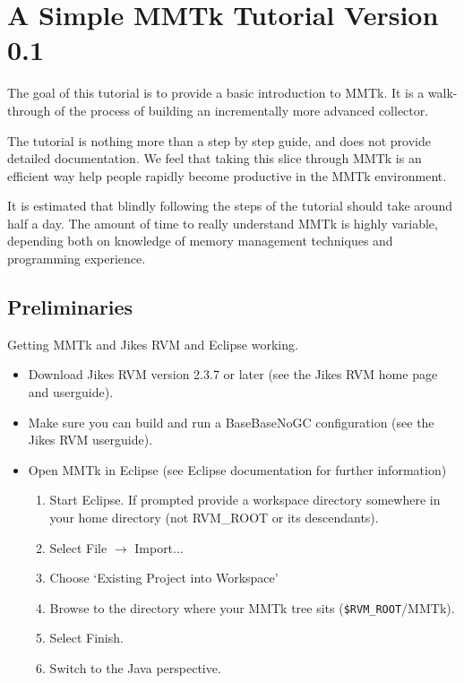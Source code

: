 \documentclass[textsize=14pt]{article}
\newcommand{\env}[1]{\texttt{\$#1}}
\newcommand{\file}[1]{\textsf{#1}}
\newcommand{\menu}[0]{$\rightarrow$}
\begin{document}
\section{A Simple MMTk Tutorial Version 0.1}

The goal of this tutorial is to provide a basic introduction to
MMTk. It is a walk-through of the process of building an
incrementally more advanced collector.

The tutorial is nothing more than a step by step guide, and does not
provide detailed documentation. We feel that taking this slice
through MMTk is an efficient way help people rapidly become
productive in the MMTk environment.

It is estimated that blindly following the steps of the tutorial
should take around half a day. The amount of time to really
understand MMTk is highly variable, depending both on knowledge of
memory management techniques and programming experience.

\subsection{Preliminaries}

Getting MMTk and Jikes RVM and Eclipse working.

\begin{itemize}
\item Download Jikes RVM version 2.3.7 or later (see the Jikes RVM
home page and userguide).

\item Make sure you can build and run a BaseBaseNoGC configuration
(see the Jikes RVM userguide).

\item Open MMTk in Eclipse (see Eclipse documentation for further
information)
\begin{enumerate}
    \item Start Eclipse. If prompted provide a workspace directory
    somewhere in your home directory (not RVM\_ROOT or its
    descendants).
    \item Select File \menu{} Import...
    \item Choose `Existing Project into Workspace'
    \item Browse to the directory where your MMTk tree
    sits (\file{\env{RVM\_ROOT}/MMTk}).
    \item Select Finish.
    \item Switch to the Java perspective.
\end{enumerate}
\end{itemize}
\end{document}
